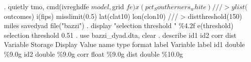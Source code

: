 . quietly tmo, cmd(ivreghdfe $model, $grid $fe) x(pct_Southerners_white) ///
>     ylist($outcomes) i(fips) misslimit(0.5) lat(clat10) lon(clon10) ///
>     distthreshold(150) miles savedyad file("bazzi")
{\smallskip}
. display "selection threshold " \%4.2f e(threshold)
selection threshold 0.51
{\smallskip}
. use bazzi_dyad.dta, clear
{\smallskip}
. describe id1 id2 corr dist
{\smallskip}
Variable      Storage   Display    Value
    name         type    format    label      Variable label
id1             double  \%9.0g                 
id2             double  \%9.0g                 
corr            float   \%9.0g                 
dist            double  \%10.0g                
{\smallskip}
